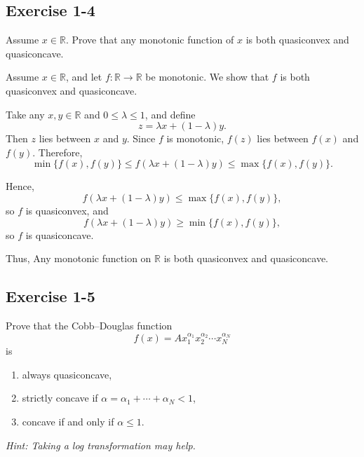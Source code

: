 \vspace{30pt}
\begin{tcolorbox}[breakable]

\subsection*{Exercise 1-4}

Assume $x \in \mathbb{R}$. Prove that any monotonic function of $x$
is both quasiconvex and quasiconcave.


\end{tcolorbox}


Assume \(x\in \mathbb{R}\), and let \(f:\mathbb{R}\to\mathbb{R}\) be monotonic.  
We show that \(f\) is both quasiconvex and quasiconcave.

Take any \(x,y\in\mathbb{R}\) and \(0\le \lambda \le 1\), and define
\[
z=\lambda x+(1-\lambda)y.
\]
Then \(z\) lies between \(x\) and \(y\). Since \(f\) is monotonic, \(f(z)\) lies between \(f(x)\) and \(f(y)\). Therefore,
\[
\min\{f(x),f(y)\}\le f(\lambda x+(1-\lambda)y)\le \max\{f(x),f(y)\}.
\]

Hence,
\[
f(\lambda x+(1-\lambda)y)\le \max\{f(x),f(y)\},
\]
so \(f\) is quasiconvex, and
\[
f(\lambda x+(1-\lambda)y)\ge \min\{f(x),f(y)\},
\]
so \(f\) is quasiconcave.

Thus,
Any monotonic function on $\mathbb{R}$ is both quasiconvex and quasiconcave.






\vspace{30pt}
\begin{tcolorbox}[breakable]

\subsection*{Exercise 1-5}

Prove that the Cobb--Douglas function
\[
f(x) = A x_1^{\alpha_1} x_2^{\alpha_2} \cdots x_N^{\alpha_N}
\]
is

\begin{enumerate}
    \item[(i)] always quasiconcave,
    \item[(ii)] strictly concave if $\alpha = \alpha_1+\cdots+\alpha_N < 1$,
    \item[(iii)] concave if and only if $\alpha \le 1$.
\end{enumerate}

\textit{Hint: Taking a log transformation may help.}

\end{tcolorbox}




